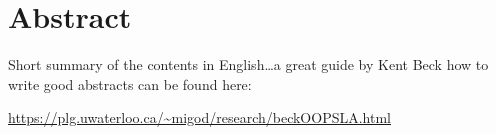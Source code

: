 \begingroup
\let\clearpage\relax
\let\cleardoublepage\relax
\let\cleardoublepage\relax
\chapter*{Abstract}
Short summary of the contents in English\dots a great guide by
Kent Beck how to write good abstracts can be found here:
\begin{center}
  \url{https://plg.uwaterloo.ca/~migod/research/beckOOPSLA.html}
\end{center}

\vfill

\endgroup

